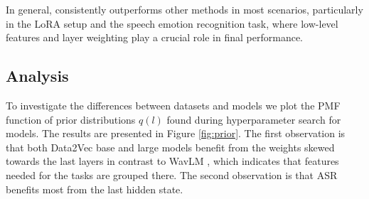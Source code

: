 In general, \varan consistently outperforms other methods in most scenarios, particularly in the LoRA setup and the speech emotion recognition task, where low-level features and layer weighting play a crucial role in final performance.

\subsection{Analysis}
\label{sec:analysis}

To investigate the differences between datasets and models we plot the PMF function of prior distributions $q(l)$ found during hyperparameter search for \varan models. The results are presented in Figure \ref{fig:prior}. The first observation is that both Data2Vec \cite{baevski2022data2vec} base and large models benefit from the weights skewed towards the last layers in contrast to WavLM \cite{chen2022wavlm}, which indicates that features needed for the tasks are grouped there. The second observation is that ASR benefits most from the last hidden state.
